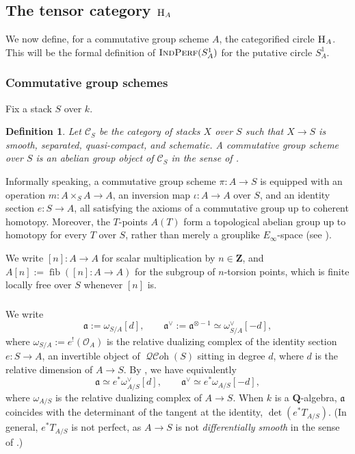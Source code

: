 \documentclass[12pt, oneside]{amsart}
\numberwithin{equation}{section}
\newtheorem{definition}[subsubsection]{Definition}
\theoremstyle{remark}
\theoremstyle{plain}
\DeclareMathOperator{\QCOH}{\mathcal{QC}\textit{oh}}
\DeclareMathOperator{\IndPerf}{\textsc{IndPerf}}
\newcommand{\Hcat}{\textup{\textsc{H}}}
\newcommand{\HA}{\Hcat_A}
\newcommand{\fra}{\mathfrak{a}}
\newcommand{\frav}{\mathfrak{a}^\vee}
\newcommand{\OO}{\mathcal{O}}
\newcommand{\bQ}{\mathbf{Q}}
\begin{document}
\subsection{The tensor category \texorpdfstring{$\HA$}{H\_A}}
\label{ssec:HA}

We now define, for a commutative group scheme $A$, the categorified circle $\HA$.
This will be the formal definition of $\IndPerf(S^1_A)$ for the putative circle $S^1_A$.

\subsubsection{Commutative group schemes}\label{sssec:comm grps}

Fix a stack $S$ over $k$.

\begin{definition}\label{def:comm grp scheme}
  Let $\mathcal{C}_{S}$ be the category of stacks $X$ over $S$ such that $X \to S$ is smooth, separated, quasi-compact, and schematic.
	A \emph{commutative group scheme} over $S$ is an abelian group object of $\mathcal{C}_S$ in the sense of \cite[Def.~1.2.4]{LurieEll1}.
\end{definition}

Informally speaking, a commutative group scheme $\pi : A \to S$ is equipped with an operation $m : A \times_S A \to A$, an inversion map $\iota : A \to A$ over $S$, and an identity section $e : S \to A$, all satisfying the axioms of a commutative group up to coherent homotopy.
Moreover, the $T$-points $A(T)$ form a topological abelian group up to homotopy for every $T$ over $S$, rather than merely a grouplike $E_\infty$-space (see \cite[\S1, Rem.~1.2.10]{LurieEll1}).

We write $[n]:A\rightarrow A$ for scalar multiplication by $n\in\mathbf{Z}$, and $A[n] := \operatorname{fib}([n] : A \to A)$ for the subgroup of $n$-torsion points, which is finite locally free over $S$ whenever $[n]$ is.

\subsubsection{}\label{sssec:fra}

We write
\[ \fra := \omega_{S/A}[d], \qquad \frav := \fra^{\otimes -1} \simeq \omega_{S/A}^\vee[-d], \]
where $\omega_{S/A} := e^!(\OO_A)$ is the relative dualizing complex of the identity section $e : S \to A$, an invertible object of $\QCOH(S)$ sitting in degree $d$, where $d$ is the relative dimension of $A \to S$.
By \cite[Cor.~6.4.2.8]{SAG}, we have equivalently
\[
  \fra \simeq e^*\omega_{A/S}^\vee[d],
  \qquad
  \frav \simeq e^*\omega_{A/S}[-d],
\]
where $\omega_{A/S}$ is the relative dualizing complex of $A \to S$.
When $k$ is a $\bQ$-algebra, $\fra$ coincides with the determinant of the tangent at the identity, $\det(e^*T_{A/S})$. (In general, $e^*T_{A/S}$ is not perfect, as $A \to S$ is not \emph{differentially smooth} in the sense of \cite[Def.~11.2.2.2]{SAG}.)
\end{document}
